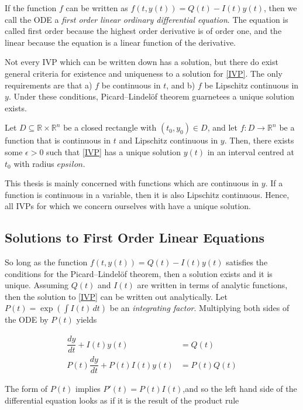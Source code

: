\noindent If the function $f$ can be written as $f(t, y(t)) = Q(t) - I(t) y(t)$, then we call the ODE a \textit{first order linear ordinary differential equation}.  The equation is called first order because the highest order derivative is of order one, and the linear because the equation is a linear function of the derivative. 

Not every IVP which can be written down has a solution, but there do exist general criteria for existence and uniqueness to a solution for \cref{IVP}.  The only requirements are that a) $f$ be continuous in $t$, and b) $f$ be Lipschitz continuous in $y$.  Under these conditions, Picard–Lindelöf theorem \cite{morris1963ordinary} guarnetees a unique solution exists.

\begin{theorem}
	Let $D \subseteq \mathbb{R} \times \mathbb{R}^n$ be a closed rectangle with $(t_0, y_0) \in D$, and let $f : D \to \mathbb{R}^n$ be a function that is continuous in $t$ and Lipschitz continuous in $y$.  Then, there exists some $\epsilon>0$ such that \cref{IVP} has a unique solution $y(t)$ in an interval centred at $t_0$ with radius $epsilon$.
\end{theorem}

\noindent This thesis is mainly concerned with functions which are continuous in $y$.  If a function is continuous in a variable, then it is also Lipschitz continuous.  Hence, all IVPs for which we concern ourselves with have a unique solution.


\subsection{Solutions to First Order Linear Equations}

So long as the function $f(t, y(t)) = Q(t) - I(t) y(t)$ satisfies the conditions for the Picard–Lindelöf theorem, then a solution exists and it is unique.  Assuming $Q(t)$ and $I(t)$ are written in terms of analytic functions, then the solution to \cref{IVP} can be written out analytically.  Let $P(t) = \exp(\int I(t) \, dt)$ be an \textit{integrating factor}.  Multiplying both sides of the ODE by $P(t)$ yields

\begin{align}
	\dfrac{dy}{dt} + I(t)y(t) &= Q(t) \\
	P(t)\dfrac{dy}{dt} + P(t)I(t)y(t) &= P(t)Q(t) 
\end{align}

\noindent  The form of $P(t)$ implies $P'(t) = P(t)I(t)$,and so the left hand side of the differential equation looks as if it is the result of the product rule

